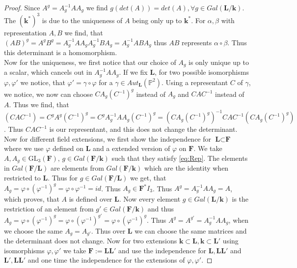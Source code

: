 \documentclass[12pt, oneside, reqno]{amsart}
\begin{document}
\begin{proof}
    Since $A^g = A_g^{-1} A A_g$ we find $g(det(A)) = det(A), \forall g \in Gal(\textbf{L}/\textbf{k})$. The $(\textbf{k}^*)^3$ is due to the uniqueness of $A$ being only up to $\textbf{k}^*$. For $\alpha, \beta$ with representation $A,B$ we find, that $(AB)^g = A^g B^g = A_g^{-1}A A_g A_g^{-1} B A_g = A_g^{-1} AB A_g$ thus $AB$ represents $\alpha \circ \beta$. Thus this determinant is a homomorphism. \\ Now for the uniqueness, we first notice that our choice of $A_g$ is only unique up to a scalar, which cancels out in $A_g^{-1} A A_g$. If we fix $\textbf{L}$, for two possible isomorphisms $\varphi, \varphi'$ we notice, that $\varphi' = \gamma \circ \varphi$ for a $\gamma \in Aut_{\textbf{L}}(\mathbb{P}^2)$. Using a representant $C$ of $\gamma$, we notice, we now can choose $C A_g (C^{-1})^g$ instead of $A_g$ and $CAC^{-1}$ instead of $A$. Thus we find, that $(CAC^{-1}) = C^g A^g (C^{-1})^g = C^g A_g^{-1} A A_g (C^{-1})^g = (C A_g (C^{-1})^g)^{-1} CAC^{-1} (CA_g (C^{-1})^g)$. Thus $CAC^{-1}$ is our representant, and this does not change the determinant. Now for different field extensions, we first show the independence for $\textbf{L} \subset \textbf{F}$ where we use $\varphi$ defined on $\textbf{L}$ and a extended version of $\varphi$ on $\textbf{F}$. We take $A, A_g \in \mathrm{GL}_3(\textbf{F}), \, g \in Gal(\textbf{F}/\textbf{k})$ such that they satisfy \ref{eq:Rep}. The elements in $Gal(\textbf{F}/\textbf{L})$ are elements from $Gal(\textbf{F}/\textbf{k})$ which are the identity when restricted to $\textbf{L}$. Thus for $g \in Gal(\textbf{F}/\textbf{L})$ we get, that $A_g = \varphi \circ (\varphi^{-1})^g = \varphi \circ \varphi^{-1} = id$. Thus $A_g \in \textbf{F}^*I_3$. Thus $A^g = A_g^{-1} A A_g = A$, which proves, that $A$ is defined over $\textbf{L}$. Now every element $g \in Gal(\textbf{L}/\textbf{k})$ is the restriction of an element from $g' \in Gal(\textbf{F}/\textbf{k})$ and thus $A_g = \varphi \circ (\varphi^{-1})^g = \varphi \circ (\varphi^{-1})^{g'} = \varphi \circ (\varphi^{-1})^g$. Thus $A^g = A^{g'} = A_g^{-1} A A_g$, when we choose the same $A_g = A_{g'}$. Thus over $\textbf{L}$ we can choose the same matrices and the determinant does not change. Now for two extensions $\textbf{k} \subset \textbf{L}, \textbf{k} \subset \textbf{L}'$ using isomorphisms $\varphi, \varphi'$ we take $\textbf{F}:= \textbf{L}\textbf{L}'$ and use the independence for $\textbf{L}, \textbf{L}\textbf{L}'$ and $\textbf{L}', \textbf{L}\textbf{L}'$ and one time the independence for the extensions of $\varphi, \varphi'$.  
\end{proof}
\end{document}
